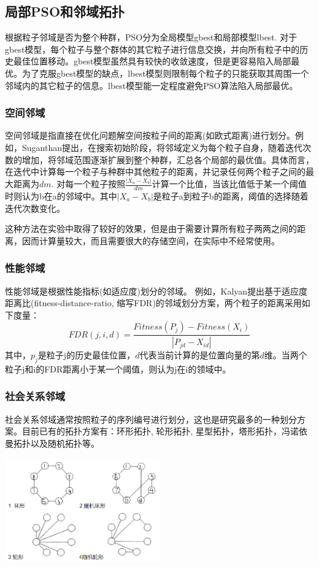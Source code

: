 \documentclass[8pt]{article}
\begin{document}
\subsection{局部PSO和邻域拓扑}
根据粒子邻域是否为整个种群，PSO分为全局模型gbest和局部模型lbest. 对于gbest模型，每个粒子与整个群体的其它粒子进行信息交换，并向所有粒子中的历史最佳位置移动。gbest模型虽然具有较快的收敛速度，但是更容易陷入局部最优。为了克服gbest模型的缺点，lbest模型则限制每个粒子的只能获取其周围一个邻域内的其它粒子的信息。lbest模型能一定程度避免PSO算法陷入局部最优。

\subsubsection{空间邻域}
空间邻域是指直接在优化问题解空间按粒子间的距离(如欧式距离)进行划分。例如，Suganthan\cite{art1}提出，在搜索初始阶段，将邻域定义为每个粒子自身，随着迭代次数的增加，将邻域范围逐渐扩展到整个种群，汇总各个局部的最优值。具体而言，在迭代中计算每一个粒子与种群中其他粒子的距离，并记录任何两个粒子之间的最大距离为$dm$. 对每一个粒子按照$\frac{|X_a-X_b|}{dm}$计算一个比值，当该比值低于某一个阈值时则认为b在a的邻域中。其中$|X_a-X_b|$是粒子a到粒子b的距离，阈值的选择随着迭代次数变化。
\par
这种方法在实验中取得了较好的效果，但是由于需要计算所有粒子两两之间的距离，因而计算量较大，而且需要很大的存储空间，在实际中不经常使用。

\subsubsection{性能邻域}
性能邻域是根据性能指标(如适应度)划分的邻域。 例如，Kalyan\cite{art2}提出基于适应度距离比(fitness-distance-ratio, 缩写FDR)的邻域划分方案，两个粒子的距离采用如下度量：
\begin{equation}
	FDR(j, i, d) = \frac{Fitness(P_j) - Fitness(X_i)}{|P_{jd} - X_{id}|}
\end{equation}
其中，$p_j$是粒子j的历史最佳位置，$d$代表当前计算的是位置向量的第$d$维。当两个粒子j和i的FDR距离小于某一个阈值，则认为j在i的领域中。

\subsubsection{社会关系邻域}
社会关系邻域通常按照粒子的序列编号进行划分，这也是研究最多的一种划分方案。目前已有的拓扑方案有：环形拓扑, 轮形拓扑, 星型拓扑，塔形拓扑，冯诺依曼拓扑以及随机拓扑等。\\
\centerline{\includegraphics[width=0.5\textwidth]{2.png}}
\end{document}
